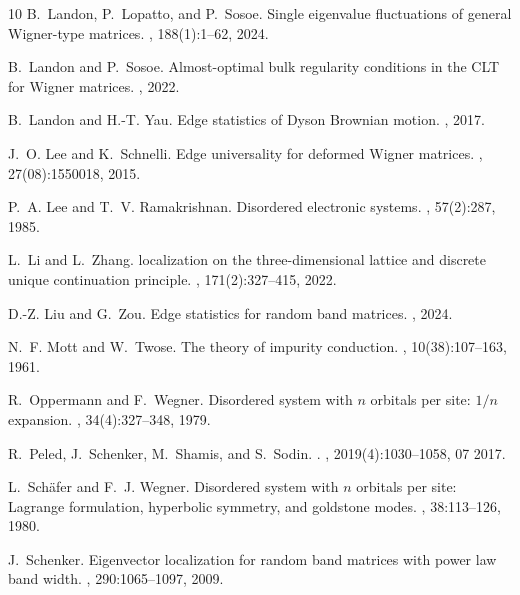 \documentclass[10pt,reqno]{amsart}
\numberwithin{equation}{section}
\numberwithin{figure}{section}
\theoremstyle{plain} %
\theoremstyle{definition} %
\numberwithin{equation}{section}
\begin{document}
\begin{thebibliography}{10}
	B.~Landon, P.~Lopatto, and P.~Sosoe.
	\newblock Single eigenvalue fluctuations of general {Wigner-type} matrices.
	, 188(1):1--62, 2024.
	
	B.~Landon and P.~Sosoe.
	\newblock Almost-optimal bulk regularity conditions in the {CLT for Wigner}
	matrices.
	, 2022.
	
	B.~Landon and H.-T. Yau.
	\newblock Edge statistics of {Dyson Brownian} motion.
	, 2017.
	
	J.~O. Lee and K.~Schnelli.
	\newblock Edge universality for deformed {Wigner} matrices.
	, 27(08):1550018, 2015.
	
	P.~A. Lee and T.~V. Ramakrishnan.
	\newblock Disordered electronic systems.
	, 57(2):287, 1985.
	
	L.~Li and L.~Zhang.
	 localization on the three-dimensional lattice
	and discrete unique continuation principle.
	, 171(2):327--415, 2022.
	
	D.-Z. Liu and G.~Zou.
	\newblock Edge statistics for random band matrices.
	, 2024.
	
	N.~F. Mott and W.~Twose.
	\newblock The theory of impurity conduction.
	, 10(38):107--163, 1961.
	
	R.~Oppermann and F.~Wegner.
	\newblock Disordered system with $n$ orbitals per site: $1/n$ expansion.
	, 34(4):327--348,
	1979.
	
	R.~Peled, J.~Schenker, M.~Shamis, and S.~Sodin.
	.
	, 2019(4):1030--1058,
	07 2017.
	
	L.~Sch{\"a}fer and F.~J. Wegner.
	\newblock Disordered system with $n$ orbitals per site: Lagrange formulation,
	hyperbolic symmetry, and goldstone modes.
	, 38:113--126,
	1980.
	
	J.~Schenker.
	\newblock Eigenvector localization for random band matrices with power law band
	width.
	, 290:1065--1097, 2009.
	

\end{thebibliography}
\end{document}
